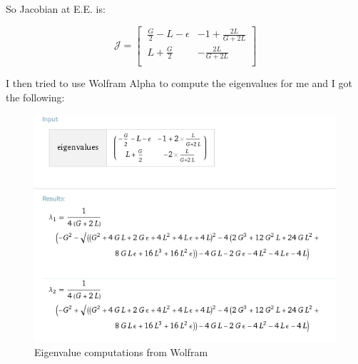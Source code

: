 \documentclass[12pt]{article}
\begin{document}
\begin{flushleft}
So Jacobian at E.E. is:

\begin{equation}
\mathcal{J} =
\begin{bmatrix}
    \ \frac{G}{2}-L-\epsilon       & -1+\frac{2L}{G+2L} \\
    \ L+\frac{G}{2}       & -\frac{2L}{G+2L} \\
\end{bmatrix}
\end{equation}

I then tried to use Wolfram Alpha to compute the eigenvalues for me and I got the following:

\begin{figure}[h!]
  \caption{Eigenvalue computations from Wolfram}
  \centering
  \includegraphics[width=1\textwidth] {Figures/Eigenvalues.png}
\end{figure}

\end{flushleft}
\end{document}
